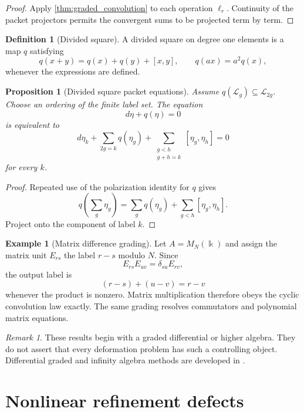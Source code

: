 \documentclass[11pt,a4paper]{article}
\theoremstyle{plain}
\newtheorem{proposition}[proposition]{Proposition}
\theoremstyle{definition}
\newtheorem{definition}[definition]{Definition}
\newtheorem{example}[example]{Example}
\theoremstyle{remark}
\newtheorem{remark}[remark]{Remark}
\newcommand{\bbk}{\Bbbk}
\newcommand{\Lcal}{\mathcal L}
\begin{document}
\begin{proof}
Apply \cref{thm:graded_convolution} to each operation $\ell_r$.  Continuity of the packet projectors permits the convergent sums to be projected term by term.
\end{proof}

\begin{definition}[Divided square]\label{def:divided_square}
A divided square on degree one elements is a map $q$ satisfying
\[
q(x+y)=q(x)+q(y)+[x,y],
\qquad
q(ax)=a^2q(x),
\]
whenever the expressions are defined.
\end{definition}

\begin{proposition}[Divided square packet equations]\label{prop:divided_square_packets}
Assume $q(\Lcal_g)\subseteq\Lcal_{2g}$.  Choose an ordering of the finite label set.  The equation
\[
d\eta+q(\eta)=0
\]
is equivalent to
\[
d\eta_k
+
\sum_{2g=k}q(\eta_g)
+
\sum_{\substack{g<h\\g+h=k}}[\eta_g,\eta_h]
=0
\]
for every $k$.
\end{proposition}

\begin{proof}
Repeated use of the polarization identity for $q$ gives
\[
q\left(\sum_g\eta_g\right)
=
\sum_gq(\eta_g)
+
\sum_{g<h}[\eta_g,\eta_h].
\]
Project onto the component of label $k$.
\end{proof}


\begin{example}[Matrix difference grading]\label{ex:matrix_difference_grading}
Let $A=M_N(\bbk)$ and assign the matrix unit $E_{rs}$ the label $r-s$ modulo $N$.  Since
\[
E_{rs}E_{uv}=\delta_{su}E_{rv},
\]
the output label is
\[
(r-s)+(u-v)=r-v
\]
whenever the product is nonzero.  Matrix multiplication therefore obeys the cyclic convolution law exactly.  The same grading resolves commutators and polynomial matrix equations.
\end{example}

\begin{remark}\label{rem:graded_boundary}
These results begin with a graded differential or higher algebra.  They do not assert that every deformation problem has such a controlling object.  Differential graded and infinity algebra methods are developed in \cite{LodayVallette2012}.
\end{remark}

\section{Nonlinear refinement defects}\label{sec:nonlinear_defects}
\end{document}
